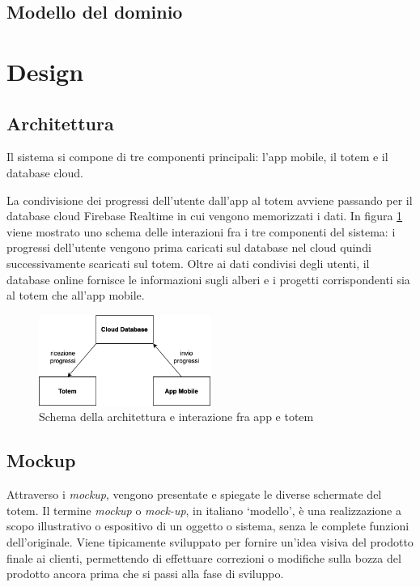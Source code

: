\subsection{Modello del dominio}

%
%
%
%
\section{Design}
\subsection{Architettura}
Il sistema si compone di tre componenti principali: l'app mobile, il totem e il database cloud.

La condivisione dei progressi dell'utente dall'app al totem avviene passando per il database cloud Firebase Realtime in cui vengono memorizzati i dati.
In figura \ref{fig:communication-schema} viene mostrato uno schema delle interazioni fra i tre componenti del sistema: i progressi dell'utente vengono prima caricati sul database nel cloud quindi successivamente scaricati sul totem.
Oltre ai dati condivisi degli utenti, il database online fornisce le informazioni sugli alberi e i progetti corrispondenti sia al totem che all'app mobile.
\begin{figure} [h]
    \centering
    \includegraphics[width=0.5\textwidth]{img/arch-totem-app-dati.png}
    \caption{Schema della architettura e interazione fra app e totem}
    \label{fig:communication-schema}
\end{figure}

\subsection{Mockup}
Attraverso i \textit{mockup}, vengono presentate e spiegate le diverse schermate del totem.
Il termine \textit{mockup} o \textit{mock-up}, in italiano \enquote*{modello}, è una realizzazione a scopo illustrativo o espositivo di un oggetto o sistema, senza le complete funzioni dell'originale. Viene tipicamente sviluppato per fornire un'idea visiva del prodotto finale ai clienti, permettendo di effettuare correzioni o modifiche sulla bozza del prodotto ancora prima che si passi alla fase di sviluppo.

